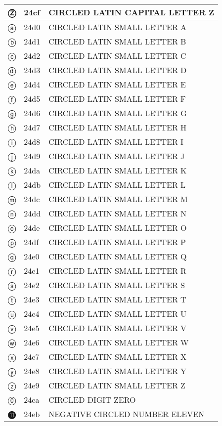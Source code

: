 \documentclass[12pt,letterpaper,openany]{book}
\begin{document}
\begin{center}
\begin{supertabular}{|m{0.25in}|m{0.5in}|m{4in}|}
			Ⓩ & 24cf & CIRCLED LATIN CAPITAL LETTER Z\\\hline
			ⓐ & 24d0 & CIRCLED LATIN SMALL LETTER A\\\hline
			ⓑ & 24d1 & CIRCLED LATIN SMALL LETTER B\\\hline
			ⓒ & 24d2 & CIRCLED LATIN SMALL LETTER C\\\hline
			ⓓ & 24d3 & CIRCLED LATIN SMALL LETTER D\\\hline
			ⓔ & 24d4 & CIRCLED LATIN SMALL LETTER E\\\hline
			ⓕ & 24d5 & CIRCLED LATIN SMALL LETTER F\\\hline
			ⓖ & 24d6 & CIRCLED LATIN SMALL LETTER G\\\hline
			ⓗ & 24d7 & CIRCLED LATIN SMALL LETTER H\\\hline
			ⓘ & 24d8 & CIRCLED LATIN SMALL LETTER I\\\hline
			ⓙ & 24d9 & CIRCLED LATIN SMALL LETTER J\\\hline
			ⓚ & 24da & CIRCLED LATIN SMALL LETTER K\\\hline
			ⓛ & 24db & CIRCLED LATIN SMALL LETTER L\\\hline
			ⓜ & 24dc & CIRCLED LATIN SMALL LETTER M\\\hline
			ⓝ & 24dd & CIRCLED LATIN SMALL LETTER N\\\hline
			ⓞ & 24de & CIRCLED LATIN SMALL LETTER O\\\hline
			ⓟ & 24df & CIRCLED LATIN SMALL LETTER P\\\hline
			ⓠ & 24e0 & CIRCLED LATIN SMALL LETTER Q\\\hline
			ⓡ & 24e1 & CIRCLED LATIN SMALL LETTER R\\\hline
			ⓢ & 24e2 & CIRCLED LATIN SMALL LETTER S\\\hline
			ⓣ & 24e3 & CIRCLED LATIN SMALL LETTER T\\\hline
			ⓤ & 24e4 & CIRCLED LATIN SMALL LETTER U\\\hline
			ⓥ & 24e5 & CIRCLED LATIN SMALL LETTER V\\\hline
			ⓦ & 24e6 & CIRCLED LATIN SMALL LETTER W\\\hline
			ⓧ & 24e7 & CIRCLED LATIN SMALL LETTER X\\\hline
			ⓨ & 24e8 & CIRCLED LATIN SMALL LETTER Y\\\hline
			ⓩ & 24e9 & CIRCLED LATIN SMALL LETTER Z\\\hline
			⓪ & 24ea & CIRCLED DIGIT ZERO\\\hline
			⓫ & 24eb & NEGATIVE CIRCLED NUMBER ELEVEN\\\hline

\end{supertabular}
\end{center}
\end{document}
